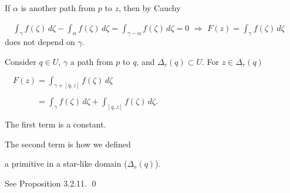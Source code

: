 \documentclass[10pt,aspectratio=169]{beamer}
\begin{document}
\begin{frame}
If $\alpha$ is another path from $p$ to $z$, then by Cauchy

\medskip

$\displaystyle \quad
\int_\gamma f(\zeta) \, d\zeta -
\int_\alpha f(\zeta) \, d\zeta 
=
\int_{\gamma-\alpha} f(\zeta) \, d\zeta  =  0
$ 
\pause
\quad $\Rightarrow$ \quad
$F(z) = \int_\gamma f(\zeta) \, d\zeta$ does not depend on $\gamma$.


\medskip
\pause

Consider $q \in U$, $\gamma$ a path from $p$ to $q$, and $\Delta_r(q) \subset U$.
\pause
For $z \in \Delta_r(q)$ %

\medskip

$\displaystyle
\quad
F(z) =
\int_{\gamma+[q,z]} f(\zeta) \, d\zeta
$

\vspace*{-0.4in}
\hspace*{2.2in}{anyantidef.pdf_t}

\vspace*{-0.85in}
\pause

$\displaystyle
\phantom{\quad F(z)}
=
\int_{\gamma} f(\zeta) \, d\zeta
+
\int_{[q,z]} f(\zeta) \, d\zeta .
$

\medskip
\pause

The first term is a constant.

\medskip
\pause

The second term is how we defined

a primitive in a star-like domain ($\Delta_r(q)$).

See Proposition 3.2.11.
\qed

\end{frame}
\end{document}
